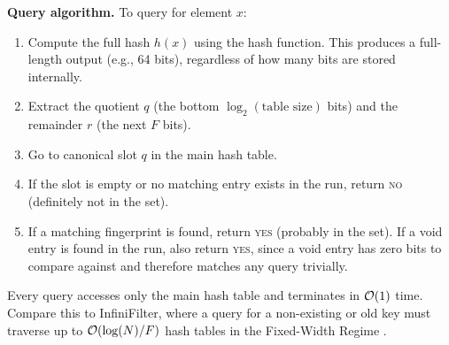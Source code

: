 \textbf{Query algorithm.} To query for element $x$:
\begin{enumerate}
  \item Compute the full hash $h(x)$ using the hash function. This 
        produces a full-length output (e.g., 64 bits), regardless of 
        how many bits are stored internally.
  \item Extract the quotient $q$ (the bottom $\log_2(\text{table 
        size})$ bits) and the remainder $r$ (the next $F$ bits).
  \item Go to canonical slot $q$ in the main hash table.
  \item If the slot is empty or no matching entry exists in the run, 
        return \textsc{no} (definitely not in the set).
  \item If a matching fingerprint is found, return \textsc{yes} 
        (probably in the set). If a void entry is found in the run, 
        also return \textsc{yes}, since a void entry has zero bits to 
        compare against and therefore matches any query trivially.
\end{enumerate}

Every query accesses only the main hash table and terminates in 
$\mathcal{O}(1)$ time. Compare this to InfiniFilter, where a query for 
a non-existing or old key must traverse up to 
$\mathcal{O}(\log(N)/F)$ hash tables in the Fixed-Width Regime 
\cite{infinifilter}.

